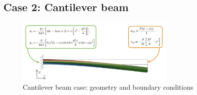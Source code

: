 \documentclass[sn-mathphys,Numbered]{sn-jnl}%
\begin{document}
\subsection{Case 2: Cantilever beam}
%
\begin{figure}[H]
	\centering
	\includegraphics[width=0.7\textwidth]{figures/cantilever/cantilever.png} 
	\caption{Cantilever beam case: geometry and boundary conditions}
	\label{fig:cantilever}
\end{figure}
\end{document}
